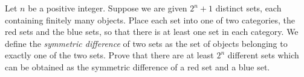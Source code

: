 Let $n$ be a positive integer. Suppose we are given $2^n+1$ distinct sets, each containing finitely many objects. Place each set into one of two categories, the red sets and the blue sets, so that there is at least one set in each category. We define the \emph{symmetric difference} of two sets as the set of objects belonging to exactly one of the two sets. Prove that there are at least $2^n$ different sets which can be obtained as the symmetric difference of a red set and a blue set.